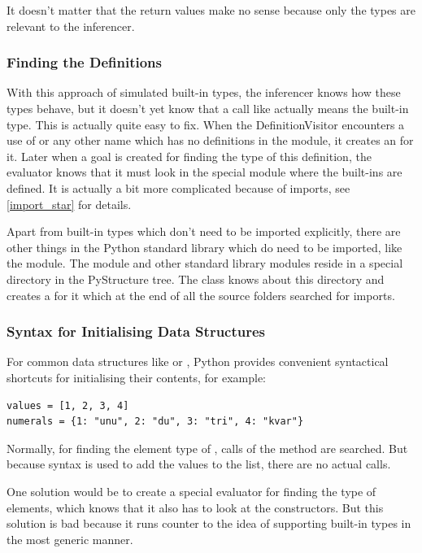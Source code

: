 \documentclass[12pt,halfparskip,DIV11,BCOR10mm]{scrreprt}
\begin{document}
It doesn't matter that the return values make no sense because only the types are relevant to the inferencer.

\subsubsection{Finding the Definitions}

With this approach of simulated built-in types, the inferencer knows how these types behave, but it doesn't yet know that a call like  actually means the built-in type. This is actually quite easy to fix. When the DefinitionVisitor encounters a use of  or any other name which has no definitions in the module, it creates an  for it. Later when a goal is created for finding the type of this definition, the evaluator knows that it must look in the special module  where the built-ins are defined. It is actually a bit more complicated because of  imports, see \vref{import_star} for details.

Apart from built-in types which don't need to be imported explicitly, there are other things in the Python standard library which do need to be imported, like the  module. The  module and other standard library modules reside in a special directory in the PyStructure tree. The  class knows about this directory and creates a  for it which at the end of all the source folders searched for imports.


\subsubsection{Syntax for Initialising Data Structures}

For common data structures like  or , Python provides convenient syntactical shortcuts for initialising their contents, for example:

\begin{lstlisting}
values = [1, 2, 3, 4]
numerals = {1: "unu", 2: "du", 3: "tri", 4: "kvar"}
\end{lstlisting}

Normally, for finding the element type of , calls of the method  are searched. But because syntax is used to add the values to the list, there are no actual  calls.

One solution would be to create a special evaluator for finding the type of  elements, which knows that it also has to look at the constructors. But this solution is bad because it runs counter to the idea of supporting built-in types in the most generic manner.
\end{document}
